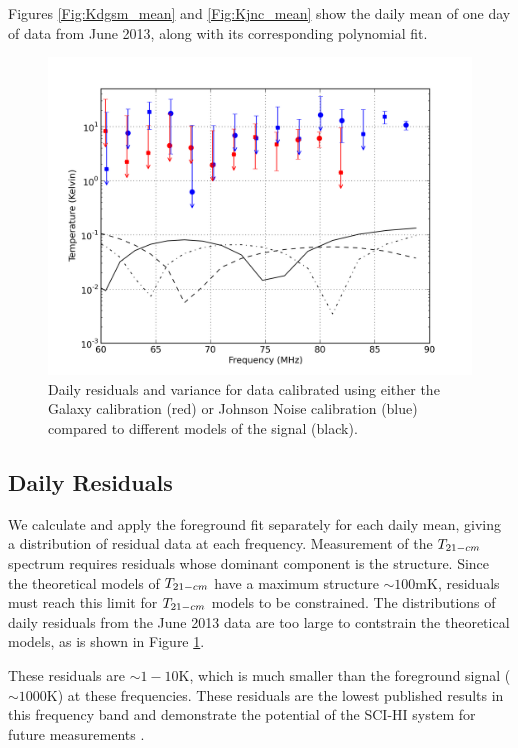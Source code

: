Figures \ref{Fig:Kdgsm_mean} and \ref{Fig:Kjnc_mean} show the daily mean of one day of data from June 2013, along with its corresponding polynomial fit. 

\begin{figure}[htb]
\begin{center}
\includegraphics[width=0.95\linewidth]{Data_analysis/figures/joint_log_means.png}
\caption{Daily residuals and variance for data calibrated using either the Galaxy calibration (red) or Johnson Noise calibration (blue) compared to different models of the \cm signal (black). }
\label{Fig:resid}
\end{center}
\end{figure}

\subsection{Daily Residuals}
We calculate and apply the foreground fit separately for each daily mean, giving a distribution of residual data at each frequency. Measurement of the $T_{21-cm}$ spectrum requires residuals whose dominant component is the \cm structure. Since the theoretical models of $T_{21-cm}$ have a maximum structure $\sim 100 $mK, residuals must reach this limit for $T_{21-cm}$ models to be constrained. The distributions of daily residuals from the June 2013 data are too large to contstrain the theoretical models, as is shown in Figure \ref{Fig:resid}. 

These residuals are $\sim 1-10$K, which is much smaller than the foreground signal ($\sim 1000$K) at these frequencies. These residuals are the lowest published results in this frequency band and demonstrate the potential of the SCI-HI system for future measurements \cite{Voytek_2014}. 

